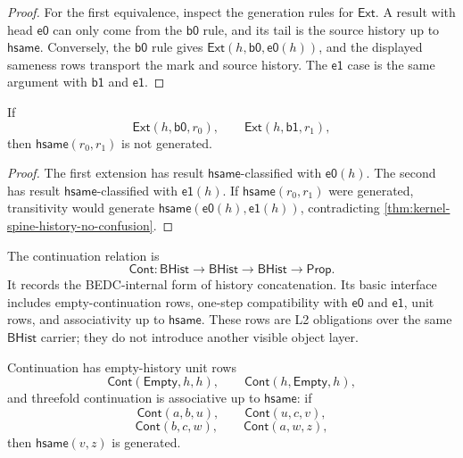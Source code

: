 \begin{proof}
For the first equivalence, inspect the generation rules for
$\mathsf{Ext}$.  A result with head $\mathsf{e0}$ can only come from the
$\mathsf{b0}$ rule, and its tail is the source history up to
$\mathsf{hsame}$.  Conversely, the $\mathsf{b0}$ rule gives
$\mathsf{Ext}(h,\mathsf{b0},\mathsf{e0}(h))$, and the displayed sameness
rows transport the mark and source history.  The $\mathsf{e1}$ case is the
same argument with $\mathsf{b1}$ and $\mathsf{e1}$.
\end{proof}

\begin{theorem}
\label{thm:kernel-spine-cross-mark-extension-separation}
If
$$
\mathsf{Ext}(h,\mathsf{b0},r_0),
\qquad
\mathsf{Ext}(h,\mathsf{b1},r_1),
$$
then $\mathsf{hsame}(r_0,r_1)$ is not generated.
\end{theorem}

\begin{proof}
The first extension has result $\mathsf{hsame}$-classified with
$\mathsf{e0}(h)$.  The second has result $\mathsf{hsame}$-classified with
$\mathsf{e1}(h)$.  If $\mathsf{hsame}(r_0,r_1)$ were generated, transitivity
would generate $\mathsf{hsame}(\mathsf{e0}(h),\mathsf{e1}(h))$, contradicting
\autoref{thm:kernel-spine-history-no-confusion}.
\end{proof}

\begin{definition}[Continuation]
\label{def:kernel-spine-continuation}
The continuation relation is
$$
\mathsf{Cont}:\mathsf{BHist}\to\mathsf{BHist}\to\mathsf{BHist}\to
\mathsf{Prop}.
$$
It records the BEDC-internal form of history concatenation.  Its basic
interface includes empty-continuation rows, one-step compatibility with
$\mathsf{e0}$ and $\mathsf{e1}$, unit rows, and associativity up to
$\mathsf{hsame}$.  These rows are L2 obligations over the same
$\mathsf{BHist}$ carrier; they do not introduce another visible object
layer.
\end{definition}

\begin{theorem}
\label{thm:kernel-spine-continuation-unit-assoc-obligations}
Continuation has empty-history unit rows
$$
\mathsf{Cont}(\mathsf{Empty},h,h),
\qquad
\mathsf{Cont}(h,\mathsf{Empty},h),
$$
and threefold continuation is associative up to $\mathsf{hsame}$: if
$$
\mathsf{Cont}(a,b,u),
\qquad
\mathsf{Cont}(u,c,v),
$$
$$
\mathsf{Cont}(b,c,w),
\qquad
\mathsf{Cont}(a,w,z),
$$
then $\mathsf{hsame}(v,z)$ is generated.
\end{theorem}

